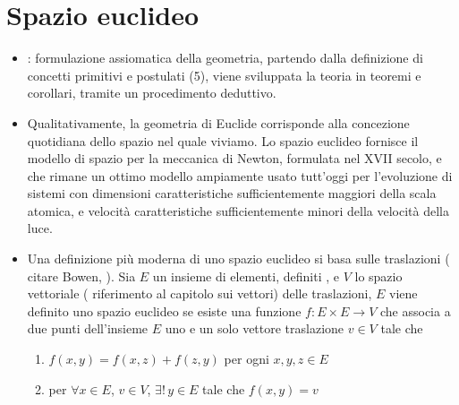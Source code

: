 \documentclass[letterpaper,10pt,english]{jupyterBook}
\begin{document}
\section{Spazio euclideo}
\label{\detokenize{ch/analytic_geometry/euclidean_space:spazio-euclideo}}\label{\detokenize{ch/analytic_geometry/euclidean_space:geometry-analytic-euclidean-space}}\label{\detokenize{ch/analytic_geometry/euclidean_space::doc}}
\sphinxAtStartPar
{}
\begin{itemize}
\item {} 
\sphinxAtStartPar
{}: formulazione assiomatica della geometria, partendo dalla definizione di concetti primitivi e postulati (5), viene sviluppata la teoria in teoremi e corollari, tramite un procedimento deduttivo.

\item {} 
\sphinxAtStartPar
Qualitativamente, la geometria di Euclide corrisponde alla concezione quotidiana dello spazio nel quale viviamo. Lo spazio euclideo fornisce il modello di spazio per la meccanica di Newton, formulata nel XVII secolo, e che rimane un ottimo modello ampiamente usato tutt’oggi per l’evoluzione di sistemi con dimensioni caratteristiche sufficientemente maggiori della scala atomica, e velocità caratteristiche sufficientemente minori della velocità della luce.

\item {} 
\sphinxAtStartPar
Una definizione più moderna di uno spazio euclideo si basa sulle traslazioni ( citare Bowen, ). Sia \(E\) un insieme di elementi, definiti , e \(V\) lo spazio vettoriale ( riferimento al capitolo sui vettori) delle traslazioni, \(E\) viene definito uno spazio euclideo se esiste una funzione \(f: E \times E \rightarrow V\) che associa a due punti dell’insieme \(E\) uno e un solo vettore traslazione \(v \in V\) tale che
\begin{enumerate}
%
\item {} 
\sphinxAtStartPar
\(f(x,y) = f(x,z) + f(z,y)\) per ogni \( x, y, z \in E\)

\item {} 
\sphinxAtStartPar
per \(\forall x \in E\), \(v \in V\), \(\exists ! \, y \in E\) tale che \(f(x,y) = v\)

\end{enumerate}


\end{itemize}
\end{document}
